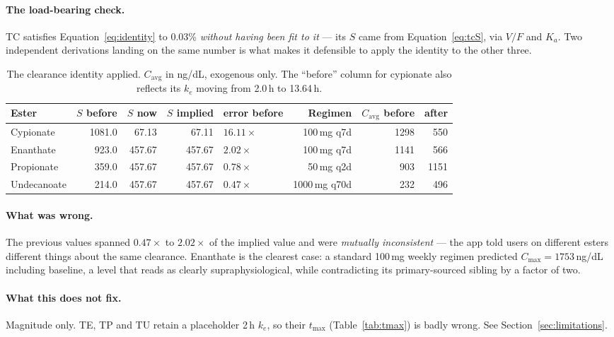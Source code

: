 \documentclass[11pt,a4paper]{article}
\begin{document}
\paragraph{The load-bearing check.} TC satisfies Equation~\ref{eq:identity} to
0.03\% \emph{without having been fit to it} --- its $S$ came from
Equation~\ref{eq:tcS}, via $V/F$ and $K_a$. Two independent derivations landing
on the same number is what makes it defensible to apply the identity to the other
three.

\begin{table}[h]
\centering
\small
\begin{tabular}{@{}lrrrlrrr@{}}
\toprule
\textbf{Ester} & $S$ before & $S$ now & $S$ implied & error before
               & \textbf{Regimen} & $C_{\mathrm{avg}}$ before & after \\
\midrule
Cypionate   & 1081.0 & 67.13 & 67.11 & $16.11\times$ & 100\,mg q7d & 1298 & 550 \\
Enanthate   & 923.0 & 457.67 & 457.67 & $2.02\times$ & 100\,mg q7d & 1141 & 566 \\
Propionate  & 359.0 & 457.67 & 457.67 & $0.78\times$ & 50\,mg q2d & 903 & 1151 \\
Undecanoate & 214.0 & 457.67 & 457.67 & $0.47\times$ & 1000\,mg q70d & 232 & 496 \\
\bottomrule
\end{tabular}
\caption{The clearance identity applied. $C_{\mathrm{avg}}$ in ng/dL, exogenous
only. The ``before'' column for cypionate also reflects its $k_e$ moving from
2.0\,h to 13.64\,h.}
\label{tab:identity}
\end{table}

\paragraph{What was wrong.} The previous values spanned $0.47\times$ to
$2.02\times$ of the implied value and were \emph{mutually inconsistent} --- the
app told users on different esters different things about the same clearance.
Enanthate is the clearest case: a standard 100\,mg weekly regimen predicted
$C_{\max} = 1753$\,ng/dL including baseline, a level that reads as clearly
supraphysiological, while contradicting its primary-sourced sibling by a factor
of two.

\paragraph{What this does not fix.} Magnitude only. TE, TP and TU retain a
placeholder 2\,h $k_e$, so their $t_{\max}$ (Table~\ref{tab:tmax}) is badly wrong.
See Section~\ref{sec:limitations}.
\end{document}
